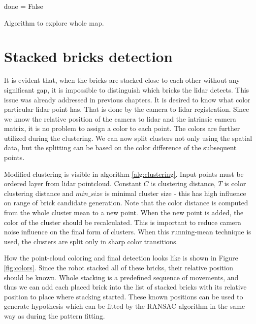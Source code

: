 \begin{algorithm}[H]
	done = False\;
	\caption{Algorithm to explore whole map.}
	\label{alg:exploration}
\end{algorithm}

\section{Stacked bricks detection}
It is evident that, when the bricks are stacked close to each other without any significant gap, it is impossible to distinguish which bricks the lidar detects. This issue was already addressed in previous chapters. It is desired to know what color particular lidar point has. That is done by the camera to lidar registration. Since we know the relative position of the camera to lidar and the intrinsic camera matrix, it is no problem to assign a color to each point. The colors are further utilized during the clustering. We can now split clusters not only using the spatial data, but the splitting can be based on the color difference of the subsequent points. 

Modified clustering is visible in algorithm \ref{alg:clustering}. Input points must be ordered layer from lidar pointcloud. Constant $C$ is clustering distance, $T$ is color clustering distance and $min\_size$ is minimal cluster size - this has high influence on range of brick candidate generation. Note that the color distance is computed from the whole cluster mean to a new point. When the new point is added, the color of the cluster should be recalculated. This is important to reduce camera noise influence on the final form of clusters. When this running-mean technique is used, the clusters are split only in sharp color transitions. 

How the point-cloud coloring and final detection looks like is shown in Figure  \ref{fig:colors}. Since the robot stacked all of these bricks, their relative position should be known. Whole stacking is a predefined sequence of movements, and thus we can add each placed brick into the list of stacked bricks with its relative position to place where stacking started. These known positions can be used to generate hypothesis which can be fitted by the RANSAC algorithm in the same way as during the pattern fitting. 

